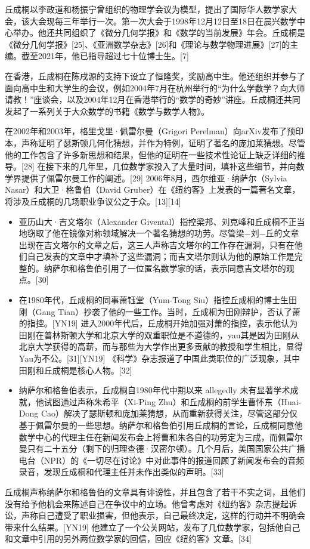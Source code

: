 丘成桐以李政道和杨振宁曾组织的物理学会议为模型，提出了国际华人数学家大会，该大会现每三年举行一次。第一次大会于1998年12月12日至18日在晨兴数学中心举办。他还共同组织了《微分几何学报》和《数学的当前发展》年会。丘成桐是《微分几何学报》[25]、《亚洲数学杂志》[26]和《理论与数学物理进展》[27]的主编。截至2021年，他已指导超过七十位博士生。[7]

在香港，丘成桐在陈戌源的支持下设立了恒隆奖，奖励高中生。他还组织并参与了面向高中生和大学生的会议，例如2004年7月在杭州举行的“为什么学数学？向大师请教！”座谈会，以及2004年12月在香港举行的“数学的奇妙”讲座。丘成桐还共同发起了一系列关于大众数学的书籍《数学与数学人物》。

在2002年和2003年，格里戈里·佩雷尔曼（Grigori Perelman）向arXiv发布了预印本，声称证明了瑟斯顿几何化猜想，并作为特例，证明了著名的庞加莱猜想。尽管他的工作包含了许多新思想和结果，但他的证明在一些技术性论证上缺乏详细的推导。[28] 在接下来的几年里，几位数学家投入了大量时间，填补这些细节，并向数学界提供了佩雷尔曼工作的阐述。[29] 2006年8月，西尔维亚·纳萨尔（Sylvia Nasar）和大卫·格鲁伯（David Gruber）在《纽约客》上发表的一篇著名文章，将涉及丘成桐的几场职业争议公之于众。[13][14]
\begin{itemize}
\item 亚历山大·吉文塔尔（Alexander Givental）指控梁邦、刘克峰和丘成桐不正当地窃取了他在镜像对称领域解决一个著名猜想的功劳。尽管梁−刘−丘的文章出现在吉文塔尔的文章之后，这三人声称吉文塔尔的工作存在漏洞，只有在他们自己发表的文章中才填补了这些漏洞；而吉文塔尔则认为他的原始工作是完整的。纳萨尔和格鲁伯引用了一位匿名数学家的话，表示同意吉文塔尔的观点。[30]  
\item 在1980年代，丘成桐的同事萧钰堂（Yum-Tong Siu）指控丘成桐的博士生田刚（Gang Tian）抄袭了他的一些工作。当时，丘成桐为田刚辩护，否认了萧的指控。[YN19] 进入2000年代后，丘成桐开始加强对萧的指控，表示他认为田刚在普林斯顿大学和北京大学的双重职位是不道德的，yau其是因为田刚从北京大学获得的高薪，而与那些为大学作出更多贡献的教授和学生相比，显得Yau为不公。[31][YN19] 《科学》杂志报道了中国此类职位的广泛现象，其中田刚和丘成桐是核心人物。[32]  
\item 纳萨尔和格鲁伯表示，丘成桐自1980年代中期以来 allegedly 未有显著学术成就，他试图通过声称朱希平（Xi-Ping Zhu）和丘成桐的前学生曹怀东（Huai-Dong Cao）解决了瑟斯顿和庞加莱猜想，从而重新获得关注，尽管这部分仅基于佩雷尔曼的一些思想。纳萨尔和格鲁伯引用丘成桐的言论，丘成桐同意他数学中心的代理主任在新闻发布会上将曹和朱各自的功劳定为三成，而佩雷尔曼只有二十五分（剩下的归理查德·汉密尔顿）。几个月后，美国国家公共广播电台（NPR）的《一切尽在讨论》中对此事件的报道回顾了新闻发布会的音频录音，发现丘成桐和代理主任并未作出类似的声明。[33]
\end{itemize}
丘成桐声称纳萨尔和格鲁伯的文章具有诽谤性，并且包含了若干不实之词，且他们没有给予他机会来陈述自己在争议中的立场。他曾考虑对《纽约客》杂志提起诉讼，声称自己遭受了职业损害，但他表示，自己最终决定，这样的行动并不明确会带来什么结果。[YN19] 他建立了一个公关网站，发布了几位数学家，包括他自己和文章中引用的另外两位数学家的回信，回应《纽约客》文章。[34]

